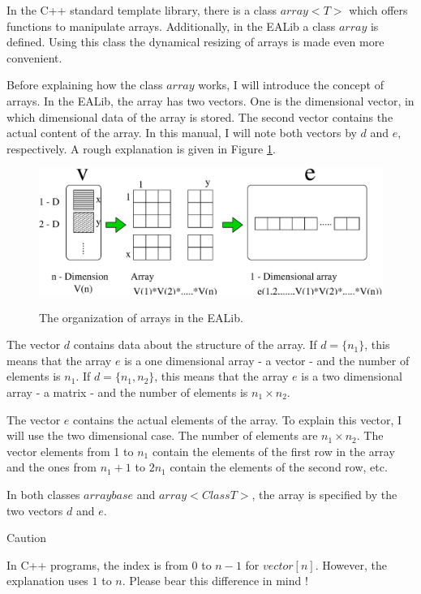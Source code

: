 \noindent
In the C++ standard template library, there is a class $array< T >$
which offers functions to manipulate arrays. Additionally, in the
EALib a class $array$ is defined. Using this class the dynamical
resizing of arrays is made even more convenient.

\vspace*{5mm}

\noindent
Before explaining how the class $array$ works, I will introduce the
concept of arrays. In the EALib, the array has two vectors. One is the
dimensional vector, in which dimensional data of the array is stored. The
second vector contains the actual content of the array. In this
manual, I will note both vectors by $d$ and $e$, respectively. A rough
explanation is given in Figure \ref{array}.

\begin{center}
\begin{figure}[h]
\includegraphics[width=13cm]{array-image.eps}\\
\caption{The organization of arrays in the EALib.}
\label{array}
\end{figure}
\end{center}

\noindent
The vector $d$ contains data about the structure of the array. If $d =
\{ n_1 \}$, this means that the array $e$ is a one dimensional array -
a vector - and the number of elements is $n_1$. If $d = \{ n_1, n_2
\}$, this means that the array $e$ is a two dimensional array - a
matrix - and the number of elements is $n_1 \times n_2$.

\clearpage

\noindent
The vector $e$ contains the actual elements of the array. To explain
this vector, I will use the two dimensional case. The number of
elements are $n_1 \times n_2$. The vector elements from 1 to $n_1$
contain the elements of the first row in the array and the ones from
$n_1+1$ to $2n_1$ contain the elements of the second row, etc.

\vspace*{5mm}

\noindent
In both classes $arraybase$ and $array< Class T>$, the array is
specified by the two vectors $d$ and $e$.

\vspace*{5mm}

\noindent
Caution

\noindent
In C++ programs, the index is from  $0$ to $n-1$ for
$vector[n]$. However, the explanation uses $1$ to $n$. Please bear
this difference in mind !


